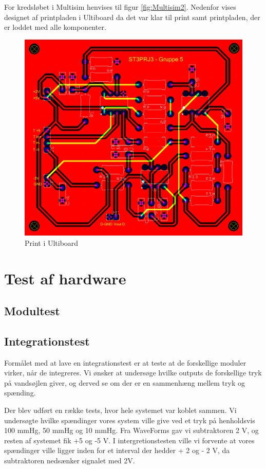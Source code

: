 For kredsløbet i Multisim henvises til figur \vref{fig:Multisim2}. Nedenfor vises designet af printpladen i Ultiboard da det var klar til print samt printpladen, der er loddet med alle komponenter.

\begin{figure}[h!]
	\centering
	\includegraphics[width=0.5\linewidth]{../Rapport/Implementering_og_test/Hardware/Ultiboard}
	\caption{Print i Ultiboard}
	\label{fig:ultiboard1}
\end{figure}

\clearpage


\section{Test af hardware}
\subsection{Modultest}

\subsection{Integrationstest}
Formålet med at lave en integrationstest er at teste at de forskellige moduler virker, når de integreres. Vi ønsker at undersøge hvilke outputs de forskellige tryk på vandsøjlen giver, og derved se om der er en sammenhæng mellem tryk og spænding.

Der blev udført en række tests, hvor hele systemet var koblet sammen. Vi undersøgte hvilke spændinger vores system ville give ved et tryk på henholdsvis 100 mmHg, 50 mmHg og 10 mmHg.  Fra WaveForms gav vi subtraktoren 2 V, og resten af systemet fik +5 og -5 V. I intergretionstesten ville vi forvente at vores spændinger ville ligger inden for et interval der hedder + 2 og - 2 V, da subtraktoren nedsænker signalet med 2V.

\vspace{0.5 cm}

